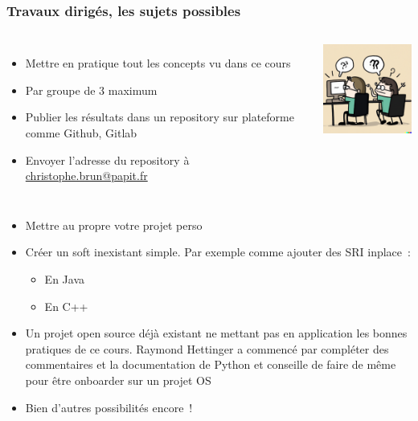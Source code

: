 \documentclass{beamer}
\begin{document}
    \begin{frame}
        \transdissolve
        \frametitle{Travaux dirigés, les sujets possibles}

        \begin{columns}
            \begin{itemize}

                \item Mettre en pratique tout les concepts vu dans ce cours
                \item Par groupe de 3 maximum
                \item Publier les résultats dans un repository sur plateforme comme Github, Gitlab
                \item Envoyer l'adresse du repository à \url{christophe.brun@papit.fr}

            \end{itemize}

            \centering
            \includegraphics[width=4cm]{image/working-together.png}
        \end{columns}

        \begin{itemize}

            \item Mettre au propre votre projet perso
            \item Créer un soft inexistant simple.
            Par exemple comme ajouter des SRI inplace~:
            \begin{itemize}
                \item En Java
                \item En C++
            \end{itemize}
            \item Un projet open source déjà existant ne mettant pas en application les bonnes pratiques de ce cours.
            Raymond Hettinger a commencé par compléter des commentaires et la documentation de Python et conseille de faire de même pour être onboarder sur un projet OS
            \item Bien d'autres possibilités encore~!

        \end{itemize}

    \end{frame}
\end{document}
